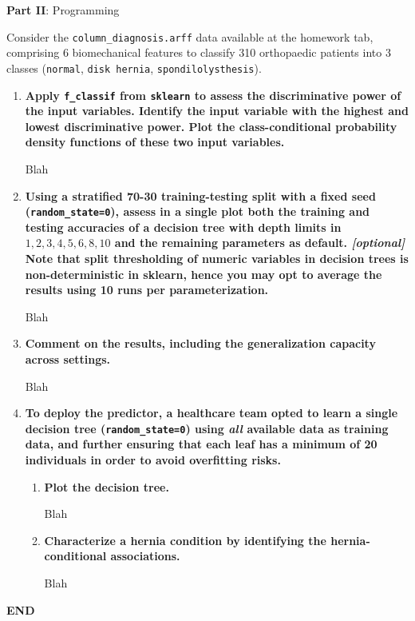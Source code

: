 \documentclass[12pt]{article}
\begin{document}
\vskip 0.5cm

\begin{center}
\large{\textbf{Part II}: Programming}\normalsize
\end{center}

\noindent Consider the \texttt{column\_diagnosis.arff} data available at the homework tab, comprising 6 biomechanical
features to classify 310 orthopaedic patients into 3 classes (\texttt{normal}, \texttt{disk hernia}, \texttt{spondilolysthesis}).

\begin{enumerate}[leftmargin=\labelsep]
    \item \textbf{Apply \texttt{f\_classif} from \texttt{sklearn} to assess the discriminative power of the input variables.
    Identify the input variable with the highest and lowest discriminative power.
    Plot the class-conditional probability density functions of these two input variables.}

    Blah

    \item \textbf{Using a stratified 70-30 training-testing split with a fixed seed (\texttt{random\_state=0}), assess in a
    single plot both the training and testing accuracies of a decision tree with depth limits in
    ${1,2,3,4,5,6,8,10}$ and the remaining parameters as default.
    \textit{[optional]} Note that split thresholding of numeric variables in decision trees is non-deterministic
    in sklearn, hence you may opt to average the results using 10 runs per parameterization.}

    Blah

    \item \textbf{Comment on the results, including the generalization capacity across settings.}

    Blah

    \item \textbf{To deploy the predictor, a healthcare team opted to learn a single decision tree
    (\texttt{random\_state=0}) using \textit{all} available data as training data, and further ensuring that each leaf has
    a minimum of 20 individuals in order to avoid overfitting risks.}
        \begin{enumerate}
        \item \textbf{Plot the decision tree.}

        Blah

        \item \textbf{Characterize a hernia condition by identifying the hernia-conditional associations.}

        Blah
        \end{enumerate}
\end{enumerate}

\vskip 1cm
\center\textbf{END}
\end{document}
